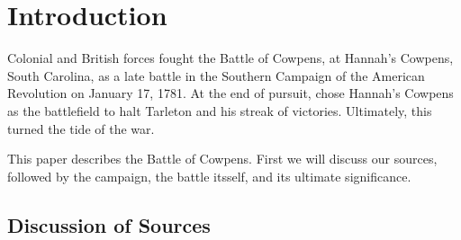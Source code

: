 \section{Introduction}

%

Colonial and British forces fought the Battle of Cowpens, at Hannah's Cowpens,
South Carolina, as a late battle in the Southern Campaign of the American
Revolution on January 17, 1781. At the end of 
pursuit,  chose Hannah's Cowpens as the
battlefield to halt Tarleton and his streak of victories. Ultimately, this
turned the tide of the war.

This paper describes the Battle of Cowpens. First we will discuss our sources, followed
by the campaign, the battle itsself, and its ultimate significance.


%

%



\subsection{Discussion of Sources}


